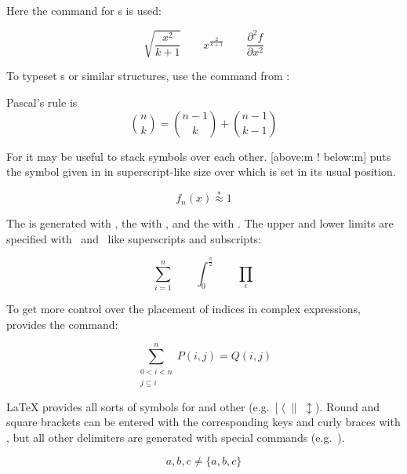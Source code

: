 Here the  command for s is used:
\begin{example}
\begin{equation*} 
  \sqrt{\frac{x^2}{k+1}}\qquad
  x^\frac{2}{k+1}\qquad
  \frac{\partial^2f}
  {\partial x^2} 
\end{equation*}
\end{example}

To typeset s or similar structures, use
the command  from :
\begin{example}
Pascal's rule is
\begin{equation*}
 \binom{n}{k} =\binom{n-1}{k}
 + \binom{n-1}{k-1}
\end{equation*}
\end{example}

For  it may be useful to stack symbols over each other.
[above:m ! below:m] puts the symbol given
in  in superscript-like size over  which
is set in its usual position.
\begin{example}
\begin{equation*}
 f_n(x) \stackrel{*}{\approx} 1
\end{equation*}
\end{example}

The \emph{} is generated with , the
\emph{} with , and the \emph{}
with . The upper and lower limits are specified with~\ai{\^}
and~\ai{\_} like superscripts and subscripts:
\begin{example}
\begin{equation*}
\sum_{i=1}^n \qquad
\int_0^{\frac{\pi}{2}} \qquad
\prod_\epsilon
\end{equation*}
\end{example}

To get more control over the placement of indices in complex
expressions,  provides the  command:
\begin{example}
\begin{equation*}
\sum^n_{\substack{0<i<n \\ 
        j\subseteq i}}
   P(i,j) = Q(i,j)
\end{equation*}
\end{example}



\LaTeX{} provides all sorts of symbols for \emph{} and other
\emph{} (e.g.~$[\;\langle\;\|\;\updownarrow$).
Round and square brackets can be entered with the corresponding keys and
curly braces with \ci{\{}, but all other delimiters are generated with
special commands (e.g.~).
\begin{example}
\begin{equation*}
{a,b,c} \neq \{a,b,c\}
\end{equation*}
\end{example}


